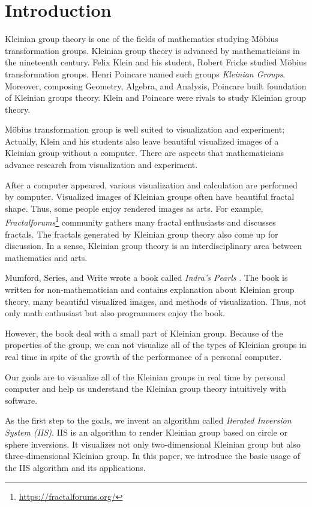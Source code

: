
\section{Introduction}

Kleinian group theory is one of the fields of mathematics studying 
M\"obius transformation groups.
Kleinian group theory is advanced by mathematicians in the nineteenth
century.
Felix Klein and his student, Robert Fricke studied M\"obius
transformation groups.
Henri Poincare named such groups \textit{Kleinian Groups}.
Moreover, composing Geometry, Algebra, and Analysis,
Poincare built foundation of Kleinian groups theory.
Klein and Poincare were rivals to study Kleinian group theory.

M\"obius transformation group is well suited to visualization and
experiment; Actually, Klein and his students also leave beautiful
visualized images of a Kleinian group without a computer.
There are aspects that mathematicians advance research from
visualization and experiment.

After a computer appeared, various visualization and calculation are
performed by computer.
Visualized images of Kleinian groups often have beautiful fractal shape.
Thus, some people enjoy rendered images as arts.
For example,
\textit{Fractalforums}\footnote{\url{https://fractalforums.org/}}
community gathers many fractal enthusiasts and discusses fractals.
The fractals generated by Kleinian group theory also come up for
discussion.
In a sense, Kleinian group theory is an interdisciplinary area between
mathematics and arts.

Mumford, Series, and Write wrote a book called
\textit{Indra's Pearls} \cite{MumfordSeriesWright200204}.
The book is written for non-mathematician and contains explanation
about Kleinian group theory, many beautiful visualized images, and
methods of visualization.
Thus, not only math enthusiast but also programmers enjoy the book.

However, the book deal with a small part of Kleinian group.
Because of the properties of the group, we can not
visualize all of the types of Kleinian groups in real time
in spite of the growth of the performance of a personal computer.

Our goals are to visualize all of the Kleinian groups in real time by
personal computer and help us understand the Kleinian group theory
intuitively with software.

As the first step to the goals, we invent an algorithm called
\textit{Iterated Inversion System (IIS)}.
IIS is an algorithm to render Kleinian group based on circle or sphere
inversions.
It visualizes not only two-dimensional Kleinian group but also
three-dimensional Kleinian group.
In this paper, we introduce the basic usage of the IIS algorithm and its
applications.

